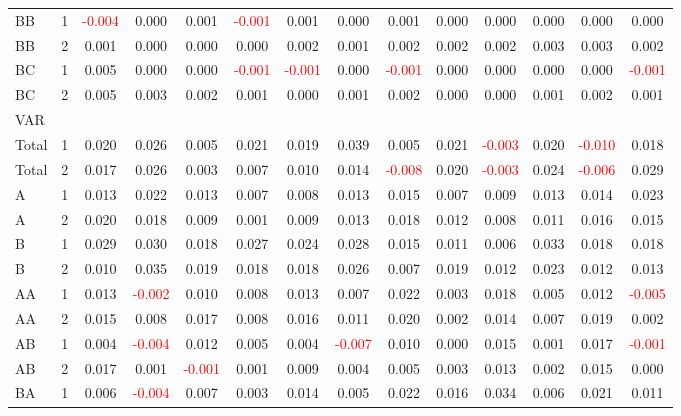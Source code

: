 \begin{table}
{\begin{tabular}{llcccccccccccc}
BB & 1 & \textcolor{red}{-0.004} & 0.000 & 0.001 & \textcolor{red}{-0.001} & 0.001 & 0.000 & 0.001 & 0.000 & 0.000 & 0.000 & 0.000 & 0.000\\
BB & 2 & 0.001 & 0.000 & 0.000 & 0.000 & 0.002 & 0.001 & 0.002 & 0.002 & 0.002 & 0.003 & 0.003 & 0.002\\
BC & 1 & 0.005 & 0.000 & 0.000 & \textcolor{red}{-0.001} & \textcolor{red}{-0.001} & 0.000 & \textcolor{red}{-0.001} & 0.000 & 0.000 & 0.000 & 0.000 & \textcolor{red}{-0.001}\\
BC & 2 & 0.005 & 0.003 & 0.002 & 0.001 & 0.000 & 0.001 & 0.002 & 0.000 & 0.000 & 0.001 & 0.002 & 0.001\\
\hline
VAR &  &  &  &  &  &  &  &  &  &  &  &  & \\
\hline
Total & 1 & 0.020 & 0.026 & 0.005 & 0.021 & 0.019 & 0.039 & 0.005 & 0.021 & \textcolor{red}{-0.003} & 0.020 & \textcolor{red}{-0.010} & 0.018\\
Total & 2 & 0.017 & 0.026 & 0.003 & 0.007 & 0.010 & 0.014 & \textcolor{red}{-0.008} & 0.020 & \textcolor{red}{-0.003} & 0.024 & \textcolor{red}{-0.006} & 0.029\\
A & 1 & 0.013 & 0.022 & 0.013 & 0.007 & 0.008 & 0.013 & 0.015 & 0.007 & 0.009 & 0.013 & 0.014 & 0.023\\
A & 2 & 0.020 & 0.018 & 0.009 & 0.001 & 0.009 & 0.013 & 0.018 & 0.012 & 0.008 & 0.011 & 0.016 & 0.015\\
B & 1 & 0.029 & 0.030 & 0.018 & 0.027 & 0.024 & 0.028 & 0.015 & 0.011 & 0.006 & 0.033 & 0.018 & 0.018\\
B & 2 & 0.010 & 0.035 & 0.019 & 0.018 & 0.018 & 0.026 & 0.007 & 0.019 & 0.012 & 0.023 & 0.012 & 0.013\\
AA & 1 & 0.013 & \textcolor{red}{-0.002} & 0.010 & 0.008 & 0.013 & 0.007 & 0.022 & 0.003 & 0.018 & 0.005 & 0.012 & \textcolor{red}{-0.005}\\
AA & 2 & 0.015 & 0.008 & 0.017 & 0.008 & 0.016 & 0.011 & 0.020 & 0.002 & 0.014 & 0.007 & 0.019 & 0.002\\
AB & 1 & 0.004 & \textcolor{red}{-0.004} & 0.012 & 0.005 & 0.004 & \textcolor{red}{-0.007} & 0.010 & 0.000 & 0.015 & 0.001 & 0.017 & \textcolor{red}{-0.001}\\
AB & 2 & 0.017 & 0.001 & \textcolor{red}{-0.001} & 0.001 & 0.009 & 0.004 & 0.005 & 0.003 & 0.013 & 0.002 & 0.015 & 0.000\\
BA & 1 & 0.006 & \textcolor{red}{-0.004} & 0.007 & 0.003 & 0.014 & 0.005 & 0.022 & 0.016 & 0.034 & 0.006 & 0.021 & 0.011\\

\end{tabular}}
\end{table}
